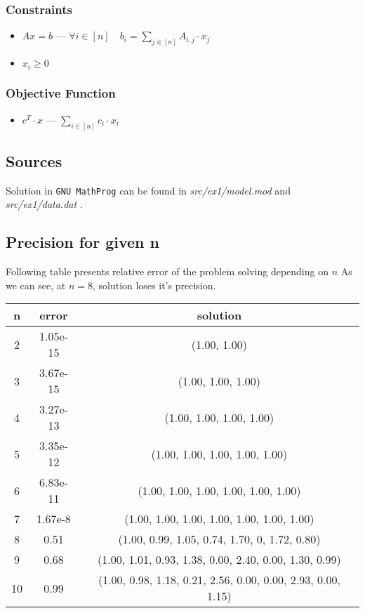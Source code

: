 \subsubsection*{Constraints}
\begin{itemize}
    \item $Ax = b$ --- $\forall i \in [n] \quad b_i = \sum_{j \in [n]} A_{i,j} \cdot x_j$
    \item $x_i \geqslant 0$
\end{itemize}
\subsubsection*{Objective Function}
\begin{itemize}
    \item  $ c^T \cdot x $ --- $\sum_{i \in [n]} c_i \cdot x_i$
\end{itemize}
\subsection{Sources}
Solution in \texttt{GNU MathProg} can be found in \textit{src/ex1/model.mod} and \textit{src/ex1/data.dat} .
\subsection{Precision for given n}
Following table presents relative error of the problem solving depending on $n$
As we can see, at $n = 8$, solution loses it's precision.
\begin{table}[H]
    \centering
    \begin{tabular}{ccc}
    n  & error & solution \\ \hline
    2  & 1.05e-15  & (1.00, 1.00)        \\ \hline
    3  & 3.67e-15  & (1.00, 1.00, 1.00)        \\ \hline
    4  & 3.27e-13  & (1.00, 1.00, 1.00, 1.00)       \\ \hline
    5  & 3.35e-12  & (1.00, 1.00, 1.00, 1.00, 1.00)        \\ \hline
    6  & 6.83e-11  & (1.00, 1.00, 1.00, 1.00, 1.00, 1.00)        \\ \hline
    7  & 1.67e-8  & (1.00, 1.00, 1.00, 1.00, 1.00, 1.00, 1.00)        \\ \hline
    8  & 0.51  & (1.00, 0.99, 1.05, 0.74, 1.70, 0, 1.72, 0.80)        \\ \hline
    9  & 0.68  & (1.00, 1.01, 0.93, 1.38, 0.00, 2.40, 0.00, 1.30, 0.99)        \\ \hline
    10 & 0.99  & (1.00, 0.98, 1.18, 0.21, 2.56, 0.00, 0.00, 2.93, 0.00, 1.15)      
    \end{tabular}
    \end{table}





